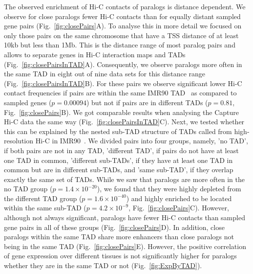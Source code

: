 \documentclass[a4paper,twoside=true,openright,parskip=full,chapterprefix=true,11pt,headings=normal,bibliography=totoc,listof=totoc,titlepage=on,captions=tableabove,draft=false]{scrreprt}
\theoremstyle{definition}
\theoremstyle{definition}
\theoremstyle{definition}
\theoremstyle{remark}
\begin{document}
The observed enrichment of Hi-C contacts of paralogs is distance
dependent. We observe for close paralogs fewer Hi-C contacts than for
equally distant sampled gene pairs (Fig.~\ref{fig:closePairs}A). To
analyse this in more detail we focused on only those pairs on the same
chromosome that have a TSS distance of at least 10kb but less than 1Mb.
This is the distance range of most paralog pairs and allows to separate
genes in Hi-C interaction maps and TADs
(Fig.~\ref{fig:closePairsInTAD}A). Consequently, we observe paralogs
more often in the same TAD in eight out of nine data sets for this
distance range (Fig.~\ref{fig:closePairsInTAD}B). For these pairs we
observe significant lower Hi-C contact frequencies if pairs are within
the same IMR90 TAD~\citep{Rao2014} as compared to sampled genes
(\(p=0.00094\)) but not if pairs are in different TADs (\(p=0.81\),
Fig.~\ref{fig:closePairs}B). We got comparable results when analysing
the Capture Hi-C data the same way (Fig.~\ref{fig:closePairsInTAD}C).
Next, we tested whether this can be explained by the nested sub-TAD
structure of TADs called from high-resolution Hi-C in
IMR90~\citep{Rao2014}. We divided pairs into four groups, namely, 'no
TAD', if both pairs are not in any TAD, 'different TAD', if pairs do not
have at least one TAD in common, 'different sub-TADs', if they have at
least one TAD in common but are in different sub-TADs, and 'same
sub-TAD', if they overlap exactly the same set of TADs. While we saw
that paralogs are more often in the no TAD group
(\(p=1.4\times10^{-20}\)), we found that they were highly depleted from
the different TAD group (\(p=1.6\times10^{-40}\)) and highly enriched to
be located within the same sub-TAD (\(p=4.2\times10^{-9}\),
Fig.~\ref{fig:closePairs}C). However, although not always significant,
paralogs have fewer Hi-C contacts than sampled gene pairs in all of
these groups (Fig.~\ref{fig:closePairs}D). In addition, close paralogs
within the same TAD share more enhancers than close paralogs not being
in the same TAD (Fig.~\ref{fig:closePairs}E). However, the positive
correlation of gene expression over different tissues is not
significantly higher for paralogs whether they are in the same TAD or
not (Fig.~\ref{fig:ExpByTAD}).
\end{document}
